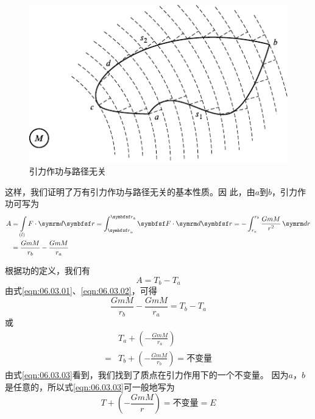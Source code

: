 \begin{figure}[h]
  \centering
  \includegraphics{figure/fig06.08}
  \caption{引力作功与路径无关}
  \label{fig:06.08}
  \vspace{-0.8em}
\end{figure}

这样，我们证明了万有引力作功与路径无关的基本性质。因
此，由$ a $到$ b $，引力作功可写为
\begin{equation}\label{eqn:06.03.01}
  \begin{aligned}
    A & = \int \limits _{(l)} F \cdot \dif \vec{r} = \int _ { \vec{r}_a } ^ { \vec{r}_b } \vec{F} \cdot \dif \vec{r} = - \int _ { r _ a } ^ { r _ b } \frac { G m M } { r ^ { 2 } } \dif r \\
      & = \frac { G m M } { r _ { b } } - \frac { G m M } { r _ { a } }
  \end{aligned}
\end{equation}

\clearpage
根据功的定义，我们有
\begin{equation}\label{eqn:06.03.02}
  A = T _ { b } - T _ { a }
\end{equation}
由式\eqref{eqn:06.03.01}、\eqref{eqn:06.03.02}，可得
\begin{equation*}
  \frac { G m M } { r _ { b } } - \frac { G m M } { r _ { a } } = T _ { b } - T _ { a }
\end{equation*}
或
\begin{equation}\label{eqn:06.03.03}
  \begin{aligned}
      & T _ { a } + \left( - \frac { G m M } { r _ { a } } \right)                 \\
    = & T _ { b } + \left( - \frac { G m M } { r _ { b } } \right) = \text{不变量}
  \end{aligned}
\end{equation}
由式\eqref{eqn:06.03.03}看到，我们找到了质点在引力作用下的一个不变量。
因为$ a $，$ b $是任意的，所以式\eqref{eqn:06.03.03}可一般地写为
\begin{equation}\label{eqn:06.03.04}
  T + \left( - \frac { G m M } { r } \right) = \text{不变量} = E
\end{equation}

